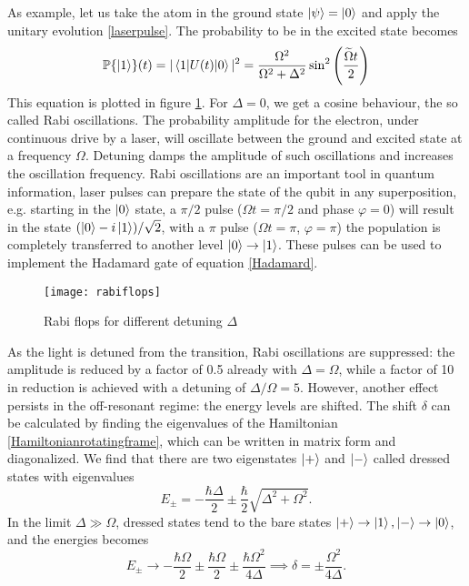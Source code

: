 As example, let us take the atom in the ground state $\ket{\psi} = \ket{0}$ and apply the unitary evolution \eqref{laserpulse}. The probability to be in the excited state becomes
\begin{equation}
\mathbb{P}\{\ket{1}\}(t) = |\braket{1|U(t)|0}|^2 = \frac{\Omega^2}{\Omega^2+\Delta^2} \sin^2\left(\frac{\widetilde{\Omega}t}{2} \right)
\end{equation}
This equation is plotted in figure \ref{rabiflops}. For $\Delta = 0$, we get a cosine behaviour, the so called Rabi oscillations. The probability amplitude for the electron, under continuous drive by a laser, will oscillate between the ground and excited state at a frequency $\Omega$. Detuning damps the amplitude of such oscillations and increases the oscillation frequency. Rabi oscillations are an important tool in quantum information, laser pulses can prepare the state of the qubit in any superposition, e.g. starting in the $\ket{0}$ state, a $\pi/2$ pulse ($\Omega t = \pi/2$ and phase $\varphi=0$) will result in the state $(\ket{0} - i\ket{1})/\sqrt{2}$, with a $\pi$ pulse ($\Omega t = \pi$, $\varphi=\pi$) the population is completely transferred to another level $\ket{0}\to \ket{1}$. These pulses can be used to implement the Hadamard gate of equation \eqref{Hadamard}.
\begin{figure}[H]
\centering
\texttt{[image: rabiflops]}
\caption{Rabi flops for different detuning $\Delta$}
\label{rabiflops}
\end{figure}
As the light is detuned from the transition, Rabi oscillations are suppressed: the amplitude is reduced by a factor of 0.5 already with $\Delta = \Omega$, while a factor of 10 in reduction is achieved with a detuning of $\Delta/\Omega = 5$. However, another effect persists in the off-resonant regime: the energy levels are shifted.
The shift $\delta$ can be calculated by finding the eigenvalues of the Hamiltonian \eqref{Hamiltonianrotatingframe}, which can be written in matrix form and diagonalized. We find that there are two eigenstates $\ket{+}$ and $\ket{-}$ called dressed states with eigenvalues
\begin{equation}
E_{\pm} = -\frac{\hbar\Delta}{2} \pm \frac{\hbar}{2}\sqrt{\Delta^2 +\Omega^2}.
\end{equation}
In the limit $\Delta \gg \Omega$, dressed states tend to the bare states $\ket{+} \to \ket{1},\ket{-}\to \ket{0}$, and the energies becomes
\begin{equation}
E_{\pm} \to -\frac{\hbar \Omega}{2} \pm \frac{\hbar \Omega}{2} \pm \frac{\hbar \Omega^2}{4\Delta} \implies \delta = \pm\frac{\Omega^2}{4\Delta}.
\end{equation}

